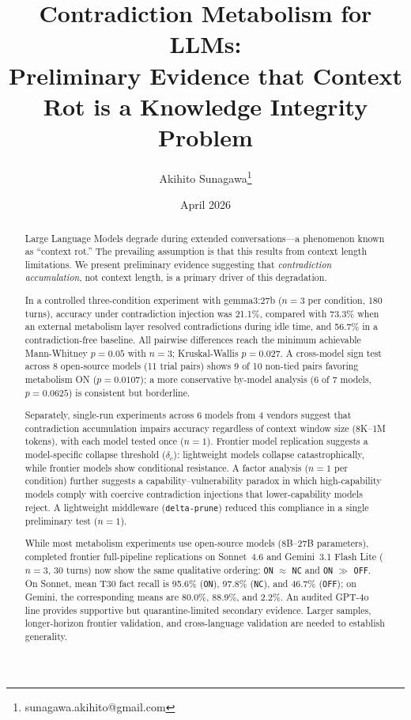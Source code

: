\documentclass[11pt,a4paper]{article}
\title{\textbf{Contradiction Metabolism for LLMs:\\Preliminary Evidence that Context Rot is a Knowledge Integrity Problem}}
\author{Akihito Sunagawa\thanks{sunagawa.akihito@gmail.com}}
\date{April 2026}
\begin{document}
\maketitle

\begin{abstract}
Large Language Models degrade during extended conversations---a phenomenon known as ``context rot.''
The prevailing assumption is that this results from context length limitations.
We present preliminary evidence suggesting that \emph{contradiction accumulation}, not context length, is a primary driver of this degradation.

In a controlled three-condition experiment with gemma3:27b ($n = 3$ per condition, 180 turns), accuracy under contradiction injection was 21.1\%, compared with 73.3\% when an external metabolism layer resolved contradictions during idle time, and 56.7\% in a contradiction-free baseline.
All pairwise differences reach the minimum achievable Mann-Whitney $p = 0.05$ with $n = 3$; Kruskal-Wallis $p = 0.027$.
A cross-model sign test across 8 open-source models (11 trial pairs) shows 9 of 10 non-tied pairs favoring metabolism ON ($p = 0.0107$); a more conservative by-model analysis (6 of 7 models, $p = 0.0625$) is consistent but borderline.

Separately, single-run experiments across 6 models from 4 vendors suggest that contradiction accumulation impairs accuracy regardless of context window size (8K--1M tokens), with each model tested once ($n = 1$).
Frontier model replication suggests a model-specific collapse threshold ($\delta_c$): lightweight models collapse catastrophically, while frontier models show conditional resistance.
A factor analysis ($n = 1$ per condition) further suggests a capability--vulnerability paradox in which high-capability models comply with coercive contradiction injections that lower-capability models reject.
A lightweight middleware (\texttt{delta-prune}) reduced this compliance in a single preliminary test ($n = 1$).

While most metabolism experiments use open-source models (8B--27B parameters), completed frontier full-pipeline replications on Sonnet~4.6 and Gemini~3.1 Flash Lite ($n = 3$, 30 turns) now show the same qualitative ordering: \texttt{ON} $\approx$ \texttt{NC} and \texttt{ON} $\gg$ \texttt{OFF}.
On Sonnet, mean T30 fact recall is 95.6\% (\texttt{ON}), 97.8\% (\texttt{NC}), and 46.7\% (\texttt{OFF}); on Gemini, the corresponding means are 80.0\%, 88.9\%, and 2.2\%.
An audited GPT-4o line provides supportive but quarantine-limited secondary evidence.
Larger samples, longer-horizon frontier validation, and cross-language validation are needed to establish generality.
\end{abstract}
\end{document}
